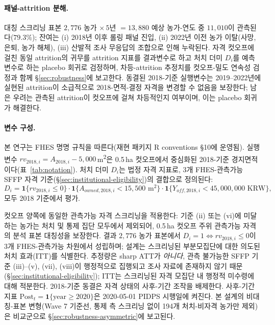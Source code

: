 \documentclass[12pt, a4paper]{article}
\begin{document}
\paragraph{패널-attrition 분해.} 대칭 스크리닝 표본 $2{,}776$ 농가 $\times\,5$년 $= 13{,}880$ 예상 농가-연도 중 $11{,}010$이 관측된다($79.3\%$); 잔여는 (i) 2018년 이후 롤링 패널 진입, (ii) 2022년 이전 농가 이탈(사망, 은퇴, 농가 해체), (iii) 산발적 조사 무응답의 조합으로 인해 누락된다. 자격 컷오프에 걸친 동일 attrition의 귀무를 attrition 지표를 결과변수로 하고 처치 더미 $D_i$를 예측변수로 하는 placebo 회귀로 검정하며, 차등-attrition 추정치를 \citet{McCrary2008_density} 컷오프-밀도 연속성 검정과 함께 \S\ref{sec:robustness}에 보고한다. 동결된 2018-기준 실행변수는 2019--2022년에 실현된 attrition이 소급적으로 2018-면적-결정 자격을 변경할 수 없음을 보장한다; 남은 우려는 관측된 attrition이 컷오프에 걸쳐 차등적인지 여부이며, 이는 placebo 회귀가 해결한다.

\paragraph{변수 구성.} 본 연구는 FHES 명명 규칙을 따른다(재현 패키지 R conventions §10에 운영됨). 실행변수 $rv_{2018,i} = A_{2018,i} - 5{,}000$\,m\textsuperscript{2}은 0.5\,ha 컷오프에서 중심화된 2018-기준 경지면적이다(표~\ref{tab:notation}). 처치 더미 $D_i$는 법정 자격 지표로, 3개 FHES-관측가능 SFFP 자격 기준(\S\ref{sec:institutional-eligibility})의 결합으로 정의된다:
\begin{equation}\label{eq:Di-def}
D_i = \mathbf{1}\{rv_{2018,i} \le 0\} \cdot \mathbf{1}\{A_{owned,2018,i} < 15{,}500 \text{ m}^2\} \cdot \mathbf{1}\{Y_{off,2018,i} < 45{,}000{,}000 \text{ KRW}\},
\end{equation}
모두 2018 기준에서 평가.

컷오프 양쪽에 동일한 관측가능 자격 스크리닝을 적용한다: 기준 (ii) 또는 (vi)에 미달하는 농가는 처치 및 통제 집단 모두에서 제외되어, 0.5\,ha 컷오프 주위 관측가능 자격의 분석 표본 대칭성을 보장한다. 결과 $2{,}776$ 농가 표본에서 $D_i = 1 \iff rv_{2018,i} \le 0$이 3개 FHES-관측가능 차원에서 성립하며; 설계는 스크리닝된 부분모집단에 대한 의도된 처치 효과(ITT)를 식별한다. 추정량은 sharp ATT가 \emph{아니다}, 관측 불가능한 SFFP 기준 (iii)--(v), (vii), (viii)이 행정적으로 집행되고 조사 자료에 존재하지 않기 때문(\S\ref{sec:institutional-eligibility}); ITT는 스크리닝된 자격 모집단 내 행정적 미수령에 대해 적분한다. 2018-기준 동결은 자격 상태의 사후-기간 조작을 배제한다. 사후-기간 지표 $\text{Post}_t = \mathbf{1}\{\text{year} \ge 2020\}$은 2020-05-01 PIDPS 시행일에 켜진다. 본 설계의 비대칭-표본 변형(Wave 7 기준선, 통제 측 스크리닝 없이 194개 처치-비자격 농가만 제외)은 비교군으로 \S\ref{sec:robustness-asymmetric}에 보고된다.
\end{document}
